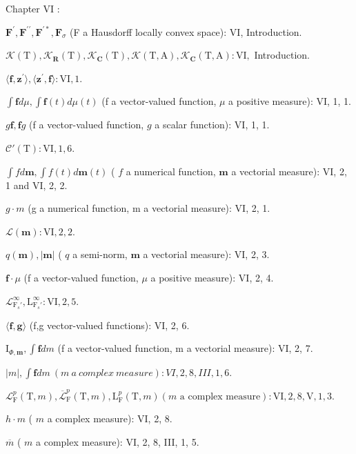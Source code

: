 Chapter VI :

\(\mathbf{F}^{\prime},\mathbf{F}^{\prime \prime},\mathbf{F}^{\prime *},\mathbf{F}_{\sigma}\) (F a Hausdorff locally convex space): VI, Introduction.

\(\mathcal{K}(\mathrm{T}),\mathcal{K}_{\mathbf{R}}(\mathrm{T}),\mathcal{K}_{\mathbf{C}}(\mathrm{T}),\mathcal{K}(\mathrm{T},\mathrm{A}),\mathcal{K}_{\mathbf{C}}(\mathrm{T},\mathrm{A}):\mathrm{VI},\) Introduction.

\(\langle \mathbf{f},\mathbf{z}^{\prime}\rangle ,\langle \mathbf{z}^{\prime},\mathbf{f}\rangle :\mathrm{VI},1.\)

\(\int \mathbf{f} d\mu, \int \mathbf{f}(t) d\mu(t)\) (f a vector-valued function, \(\mu\) a positive measure): VI, 1, 1.

\(g\mathbf{f},\mathbf{f}g\) (f a vector-valued function, \(g\) a scalar function): VI, 1, 1.

\(\mathcal{C}'(\mathrm{T}) : \mathrm{VI}, 1, 6.\)

\(\int f d\mathbf{m}, \int f(t) d\mathbf{m}(t)\) ( \(f\) a numerical function, \(\mathbf{m}\) a vectorial measure): VI, 2, 1 and VI, 2, 2.

\(g \cdot m\) (g a numerical function, m a vectorial measure): VI, 2, 1.

\(\mathcal{L}(\mathbf{m}) : \mathrm{VI}, 2, 2.\)

\(q(\mathbf{m}), |\mathbf{m}|\) ( \(q\) a semi-norm, \(\mathbf{m}\) a vectorial measure): VI, 2, 3.

\(\mathbf{f} \cdot \mu\) (f a vector-valued function, \(\mu\) a positive measure): VI, 2, 4.

\(\mathcal{L}_{\mathrm{F}_s'}^{\infty}, \mathrm{L}_{\mathrm{F}_s'}^{\infty} : \mathrm{VI}, 2, 5.\)

\(\langle \mathbf{f},\mathbf{g}\rangle\) (f,g vector-valued functions): VI, 2, 6.

\(\mathrm{I}_{\Phi ,\mathbf{m}},\int \mathbf{f}dm\) (f a vector-valued function, m a vectorial measure): VI, 2, 7.

\(|m|, \int \mathbf{f} dm \ (m \ a \ complex \ measure) : VI, 2, 8, III, 1, 6.\)

\(\mathcal{L}_{\mathrm{F}}^{p}(\mathrm{T},m), \overline{\mathcal{L}}_{\mathrm{F}}^{p}(\mathrm{T},m), \mathrm{L}_{\mathrm{F}}^{p}(\mathrm{T},m) (m \text{ a complex measure}): \mathrm{VI}, 2, 8, \mathrm{V}, 1, 3.\)

\(h \cdot m\) ( \(m\) a complex measure): VI, 2, 8.

\(\overline{m}\) ( \(m\) a complex measure): VI, 2, 8, III, 1, 5.

